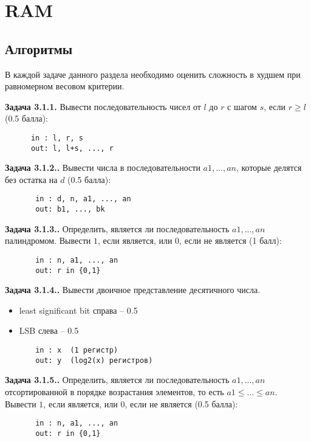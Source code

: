 \documentclass[a4paper, 10pt]{extarticle}
\newcommand{\Task}[1]{\textbf{Задача #1.}}
\begin{document}
\section{RAM}
\subsection{Алгоритмы}
В каждой задаче данного раздела необходимо оценить сложность в худшем при равномерном весовом критерии.

\Task{3.1.1} Вывести последовательность чисел от $l$ до $r$ с шагом $s$, если $r \geq l$ (0.5 балла):
\begin{verbatim}
      in : l, r, s
      out: l, l+s, ..., r
\end{verbatim}


\Task{3.1.2.} Вывести числа в последовательности $a1, ..., an$, которые делятся без остатка на $d$ (0.5 балла):
\begin{verbatim}
       in : d, n, a1, ..., an
       out: b1, ..., bk
\end{verbatim}
       

\Task{3.1.3.} Определить, является ли последовательность $a1, ..., an$ палиндромом. 
Вывести $1$, если является, или $0$, если не является (1 балл):
\begin{verbatim}
       in : n, a1, ..., an
       out: r in {0,1}
\end{verbatim}

\Task{3.1.4.} Вывести двоичное представление десятичного числа.
\begin{itemize}
 \item least significant bit справа -- 0.5 
 \item LSB слева -- 0.5
\end{itemize}

\begin{verbatim}
       in : x  (1 регистр)
       out: y  (log2(x) регистров)
\end{verbatim}
       
\Task{3.1.5.} Определить, является ли последовательность $a1, ..., an$ отсортированной в порядке возрастания элементов, то есть 
$a1 \leq ... \leq an$. Вывести $1$, если является, или $0$, если не является (0.5 балла):
\begin{verbatim}
       in : n, a1, ..., an
       out: r in {0,1}
\end{verbatim}
\end{document}
